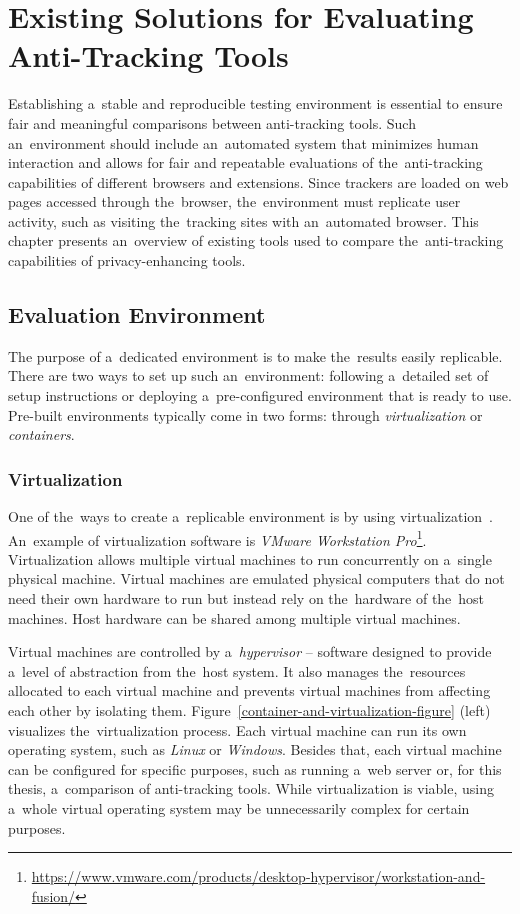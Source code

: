 \chapter{Existing Solutions for Evaluating Anti-Tracking Tools}
\label{chapter-3}

Establishing a~stable and reproducible testing environment is essential to ensure fair and meaningful comparisons between anti-tracking tools. Such an~environment should include an~automated system that minimizes human interaction and allows for fair and repeatable evaluations of the~anti-tracking capabilities of different browsers and extensions. Since trackers are loaded on web pages accessed through the~browser, the~environment must replicate user activity, such as visiting the~tracking sites with an~automated browser. This chapter presents an~overview of existing tools used to compare the~anti-tracking capabilities of privacy-enhancing tools.

\section{Evaluation Environment}
\label{EnvironmentSection}
The purpose of a~dedicated environment is to make the~results easily replicable. There are two ways to set up such an~environment: following a~detailed set of setup instructions or deploying a~pre-configured environment that is ready to use. Pre-built environments typically come in two forms: through \textit{virtualization} or \textit{containers}.

\subsection{Virtualization}
One of the~ways to create a~replicable environment is by using virtualization~\cite{virtualization}. An~example of virtualization software is \textit{VMware Workstation Pro}\footnote{\url{https://www.vmware.com/products/desktop-hypervisor/workstation-and-fusion/}}. Virtualization allows multiple virtual machines to run concurrently on a~single physical machine. Virtual machines are emulated physical computers that do not need their own hardware to run but instead rely on the~hardware of the~host machines. Host hardware can be shared among multiple virtual machines. 

Virtual machines are controlled by a~\textit{hypervisor} -- software designed to provide a~level of abstraction from the~host system. It also manages the~resources allocated to each virtual machine and prevents virtual machines from affecting each other by isolating them. Figure~\ref{container-and-virtualization-figure} (left) visualizes the~virtualization process. Each virtual machine can run its own operating system, such as \emph{Linux} or \emph{Windows}. Besides that, each virtual machine can be configured for specific purposes, such as running a~web server or, for this thesis, a~comparison of anti-tracking tools. While virtualization is viable, using a~whole virtual operating system may be unnecessarily complex for certain purposes.

